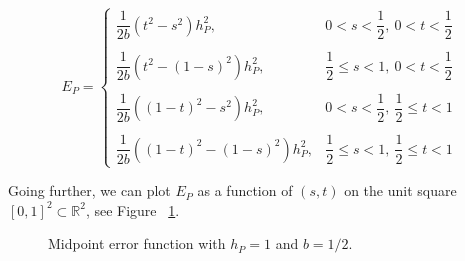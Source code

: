 \documentclass{article}
\begin{document}
\[
E_P
=
\begin{cases}
    \dfrac{1}{2b}
    (t^2 - s^2)
    h_P^2, & 0 < s < \dfrac{1}{2}, \: 0 < t < \dfrac{1}{2}
    \\
    \\
    \dfrac{1}{2b}
    (t^2 - (1 - s)^2)
    h_P^2, & \dfrac{1}{2} \leq s < 1, \: 0 < t < \dfrac{1}{2}
    \\
    \\
    \dfrac{1}{2b}
    ((1 - t)^2 - s^2)
    h_P^2, & 0 < s < \dfrac{1}{2}, \: \dfrac{1}{2} \leq t < 1
    \\
    \\
    \dfrac{1}{2b}
    ((1 - t)^2 - (1 - s)^2)
    h_P^2, & \dfrac{1}{2} \leq s < 1, \: \dfrac{1}{2} \leq t < 1
\end{cases}
\]

\noindent
Going further, we can plot $E_P$ as a function of $(s,t)$ on the unit square $[0,1]^2 \subset \mathbb{R}^2$, see Figure ~\ref{fig:midpterr}.

\newpage

\begin{figure}[h]
    \centering
    \label{fig:midpterr}
    \caption{Midpoint error function with $h_P = 1$ and $b = 1/2$.}
\end{figure}
\end{document}

